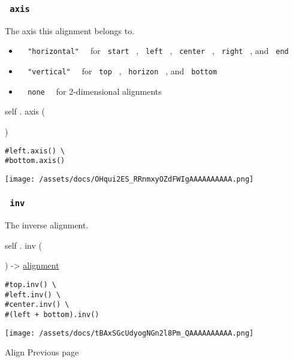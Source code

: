 \subsubsection{\texorpdfstring{\texttt{\ axis\ }}{ axis }}\label{definitions-axis}

The axis this alignment belongs to.

\begin{itemize}
\tightlist
\item
  \texttt{\ }{\texttt{\ "horizontal"\ }}\texttt{\ } for
  \texttt{\ start\ } , \texttt{\ left\ } , \texttt{\ center\ } ,
  \texttt{\ right\ } , and \texttt{\ end\ }
\item
  \texttt{\ }{\texttt{\ "vertical"\ }}\texttt{\ } for \texttt{\ top\ } ,
  \texttt{\ horizon\ } , and \texttt{\ bottom\ }
\item
  \texttt{\ }{\texttt{\ none\ }}\texttt{\ } for 2-dimensional alignments
\end{itemize}

self { . } { axis } (

)

\begin{verbatim}
#left.axis() \
#bottom.axis()
\end{verbatim}

\texttt{[image: /assets/docs/OHqui2ES\_RRnmxyOZdFWIgAAAAAAAAAA.png]}

\subsubsection{\texorpdfstring{\texttt{\ inv\ }}{ inv }}\label{definitions-inv}

The inverse alignment.

self { . } { inv } (

) -\textgreater{} \href{/docs/reference/layout/alignment/}{alignment}

\begin{verbatim}
#top.inv() \
#left.inv() \
#center.inv() \
#(left + bottom).inv()
\end{verbatim}

\texttt{[image: /assets/docs/tBAxSGcUdyogNGn2l8Pm\_QAAAAAAAAAA.png]}

\href{/docs/reference/layout/align/}{\pandocbounded{}}

{ Align } { Previous page }

\href{/docs/reference/layout/angle/}{\pandocbounded{}}

